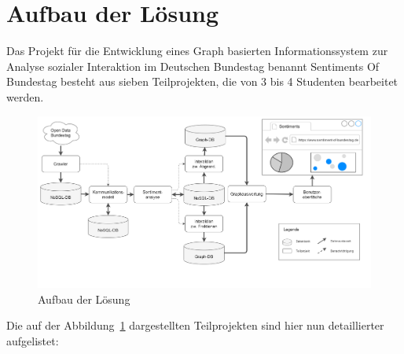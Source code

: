 \section{Aufbau der Lösung}\label{sec:01_02_aufbauLoesung}
Das Projekt für die Entwicklung eines Graph basierten Informationssystem zur Analyse sozialer Interaktion im Deutschen Bundestag benannt \glqq Sentiments Of Bundestag\grqq{} besteht aus sieben Teilprojekten, die von 3 bis 4 Studenten bearbeitet werden. 

\begin{figure}[H]
    \centering
    \includegraphics[width=6in]{images/01-Einleitung/SentimentOfBundestag.png}
    \caption{Aufbau der Lösung}
    \label{fig:aufbauderLösungSOB}
\end{figure}
Die auf der Abbildung~\ref{fig:aufbauderLösungSOB} dargestellten Teilprojekten sind hier nun detaillierter aufgelistet:
